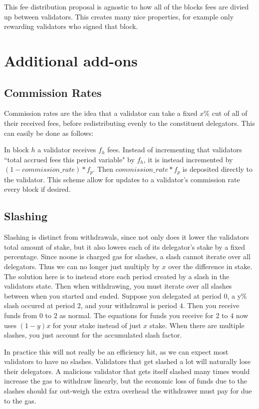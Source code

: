 \documentclass[]{article}
\begin{document}
This fee distribution proposal is agnostic to how all of the blocks fees are divied up between validators.
This creates many nice properties, for example only rewarding validators who signed that block.
 
\section{Additional add-ons}
\subsection{Commission Rates}
Commission rates are the idea that a validator can take a fixed $x\%$ cut of all of their received fees, before redistributing evenly to the constituent delegators.
This can easily be done as follows:

In block $h$ a validator receives $f_h$ fees.
Instead of incrementing that validators ``total accrued fees this period variable" by $f_h$, it is instead incremented by $(1 - commission\_rate) * f_p$.
Then $commission\_rate * f_p$ is deposited directly to the validator.
This scheme allow for updates to a validator's commission rate every block if desired.

\subsection{Slashing}
\label{ssec:slashing}
Slashing is distinct from withdrawals, since not only does it lower the validators total amount of stake, but it also lowers each of its delegator's stake by a fixed percentage.
Since noone is charged gas for slashes, a slash cannot iterate over all delegators.
Thus we can no longer just multiply by $x$ over the difference in stake. 
The solution here is to instead store each period created by a slash in the validators state.
Then when withdrawing, you must iterate over all slashes between when you started and ended.
Suppose you delegated at period $0$, a y\% slash occured at period $2$, and your withdrawal is period $4$.
Then you receive funds from $0$ to $2$ as normal.
The equations for funds you receive for $2$ to $4$ now uses $(1 - y)x$ for your stake instead of just $x$ stake.
When there are multiple slashes, you just account for the accumulated slash factor.

In practice this will not really be an efficiency hit, as we can expect most validators to have no slashes.
Validators that get slashed a lot will naturally lose their delegators.
A malicious validator that gets itself slashed many times would increase the gas to withdraw linearly, but the economic loss of funds due to the slashes should far out-weigh the extra overhead the withdrawer must pay for due to the gas.
\end{document}
